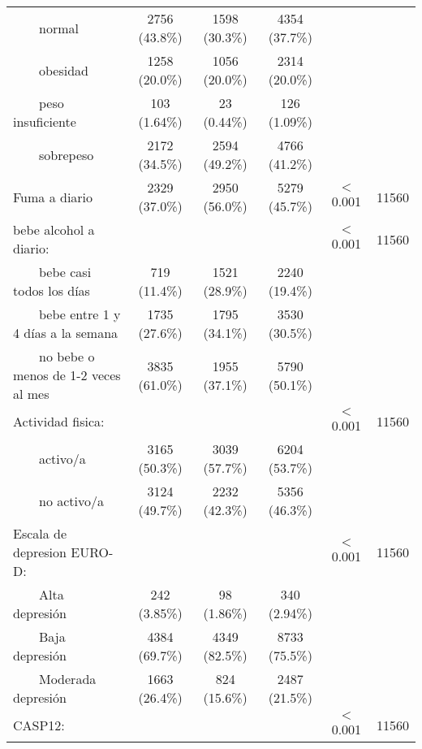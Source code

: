 \documentclass[a4paper,12pt, titlepage]{article}\usepackage[]{graphicx}\usepackage[]{color}
\begin{document}
\begin{landscape}
\begin{small}
\begin{longtable}{lccccc}
$\qquad$normal &    2756 (43.8\%)     &    1598 (30.3\%)     &    4354 (37.7\%)     &           &      \\ 
$\qquad$obesidad &    1258 (20.0\%)     &    1056 (20.0\%)     &    2314 (20.0\%)     &           &      \\ 
$\qquad$peso insuficiente &     103 (1.64\%)     &     23 (0.44\%)      &     126 (1.09\%)     &           &      \\ 
$\qquad$sobrepeso &    2172 (34.5\%)     &    2594 (49.2\%)     &    4766 (41.2\%)     &           &      \\ 
Fuma a diario &    2329 (37.0\%)     &    2950 (56.0\%)     &    5279 (45.7\%)     &  $<$0.001   & 11560\\ 
bebe alcohol a diario: &                     &                     &                     &  $<$0.001   & 11560\\ 
$\qquad$bebe casi todos los días &     719 (11.4\%)     &    1521 (28.9\%)     &    2240 (19.4\%)     &           &      \\ 
$\qquad$bebe entre 1 y 4 días a la semana &    1735 (27.6\%)     &    1795 (34.1\%)     &    3530 (30.5\%)     &           &      \\ 
$\qquad$no bebe o menos de 1-2 veces al mes &    3835 (61.0\%)     &    1955 (37.1\%)     &    5790 (50.1\%)     &           &      \\ 
Actividad fisica: &                     &                     &                     &  $<$0.001   & 11560\\ 
$\qquad$activo‎/a &    3165 (50.3\%)     &    3039 (57.7\%)     &    6204 (53.7\%)     &           &      \\ 
$\qquad$no activo‎/a &    3124 (49.7\%)     &    2232 (42.3\%)     &    5356 (46.3\%)     &           &      \\ 
Escala de depresion EURO-D: &                     &                     &                     &  $<$0.001   & 11560\\ 
$\qquad$Alta depresión &     242 (3.85\%)     &     98 (1.86\%)      &     340 (2.94\%)     &           &      \\ 
$\qquad$Baja depresión &    4384 (69.7\%)     &    4349 (82.5\%)     &    8733 (75.5\%)     &           &      \\ 
$\qquad$Moderada depresión &    1663 (26.4\%)     &     824 (15.6\%)     &    2487 (21.5\%)     &           &      \\ 
CASP12: &                     &                     &                     &  $<$0.001   & 11560\\ 

\end{longtable}
\end{small}
\end{landscape}
\end{document}
